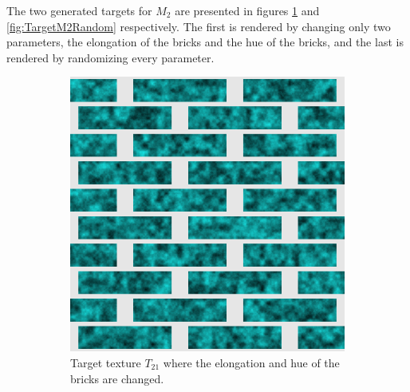 The two generated targets for $M_2$ are presented in figures \ref{fig:TargetM2TwoParam} and \ref{fig:TargetM2Random} respectively. The first is rendered by changing only two parameters, the elongation of the bricks and the hue of the bricks, and the last is rendered by randomizing every parameter.

\begin{figure}[!h]
\centering
\begin{subfigure}[t]{.25\textwidth}
    \centering
    \includegraphics[width=\linewidth]{img/evaluation/simple_brick_target brick_elongate=4,hue=0.5.png}
    \caption{Target texture $T_ {21}$ where the elongation and hue of the bricks are changed.}
    \label{fig:TargetM2TwoParam}
\end{subfigure}\hspace{1.5cm}
\begin{subfigure}[t]{.25\textwidth}
    \centering

\end{subfigure}
\end{figure}
